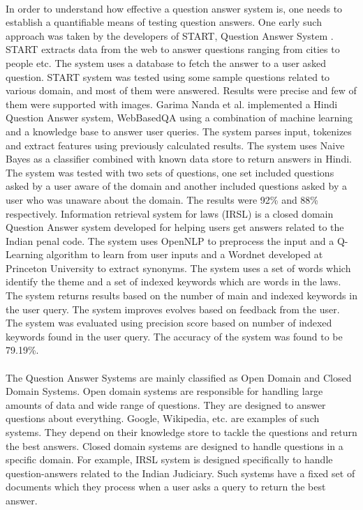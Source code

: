 \paragraph{}
In order to understand how effective a question answer system is, one
needs to establish a quantifiable means of testing question answers. One early such approach was taken by the developers of START, Question Answer System \cite{katz1997annotating}. START extracts data from the web to answer questions ranging from cities to people etc. The system uses a database to fetch the answer to a user asked question. START system was tested using some sample questions related to various domain, and most of them were answered. Results were precise and few of them were supported with images. Garima Nanda et al. implemented a Hindi Question Answer system, WebBasedQA \cite{nanda2016Hindi} using a combination of machine learning and a knowledge base to answer user queries. The system parses input, tokenizes and extract features using previously calculated results. The system uses  Naive Bayes as a classifier combined with known data store to return answers in Hindi. The system was  tested with two sets of questions, one set included questions asked by a user aware of the domain and another included questions asked by a user who was unaware about the domain. The results were 92\% and 88\% respectively. Information retrieval system for laws (IRSL)\cite {sangeetha2017information} is a closed domain Question Answer system developed for helping users get answers related to the Indian penal code. The system uses OpenNLP to preprocess the input and a Q-Learning algorithm to learn from user inputs and a Wordnet developed at Princeton University to extract synonyms. The system uses a set of words which identify the theme and a set of indexed keywords which are words in the laws. The system returns results based on the number of main and indexed keywords in the user query. The system improves evolves based on feedback from the user. The system was evaluated using precision score based on number of indexed keywords found in the user query. The accuracy of the system was found to be 79.19\%. 

\paragraph{}
The Question Answer Systems are mainly classified as Open Domain and Closed Domain Systems. 
Open domain systems are responsible for handling large amounts of data and wide range of questions. They are designed to answer questions about everything. Google, Wikipedia, etc. are examples of such systems. They depend on their knowledge store to tackle the questions and return the best answers.
Closed domain systems are designed to handle questions in a specific domain. For example, IRSL system is designed specifically to handle question-answers related to the Indian Judiciary. Such systems have a fixed set of documents which they process when a user asks a query to return the best answer.

